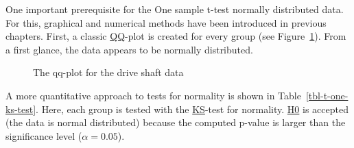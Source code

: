 \documentclass[
  a4paper,
]{scrbook}
\begin{document}
\endgroup

One important prerequisite for the One sample t-test normally
distributed data. For this, graphical and numerical methods have been
introduced in previous chapters. First, a classic \hyperref[qq]{QQ}-plot
is created for every group (see Figure~\ref{fig-t-one-qq}). From a first
glance, the data appears to be normally distributed.

\begin{figure}[ht]


\caption{\label{fig-t-one-qq}The qq-plot for the drive shaft data}

\end{figure}%

A more quantitative approach to tests for normality is shown in
Table~\ref{tbl-t-one-ks-test}. Here, each group is tested with the
\hyperref[KS]{KS}-test for normality. \hyperref[H0]{H0} is accepted (the
data is normal distributed) because the computed p-value is larger than
the significance level (\(\alpha  = 0.05\)).
\end{document}
